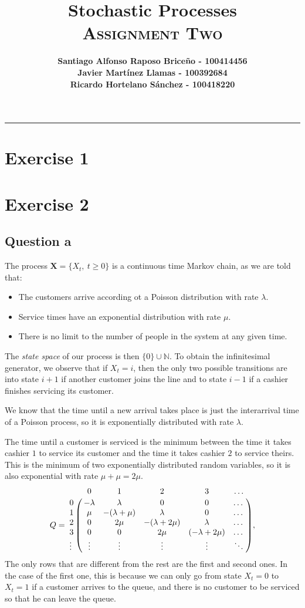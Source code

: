 \documentclass[11pt, a4paper]{article}
\title{\vspace{-8ex} \huge \bfseries Stochastic Processes\\
	\LARGE \normalfont \textsc{Assignment Two} \vspace{-2ex}}
\author{\bfseries Santiago Alfonso Raposo Briceño - 100414456 \\
	\bfseries Javier Martínez Llamas - 100392684\\
	\bfseries Ricardo Hortelano Sánchez - 100418220}
\date{\vspace{-5ex}} %
\begin{document}
	\maketitle
	\hrule

\section{Exercise 1}

\section{Exercise 2}
\subsection*{Question a}
The process $\bm{X} = \{X_t, \ t\geq 0\}$ is a continuous time Markov chain, as we are told that:
\begin{itemize}
	\item The customers arrive according ot a Poisson distribution with rate $\lambda$.
	\item Service times have an exponential distribution with rate $\mu$.
	\item There is no limit to the number of people in the system at any given time.
\end{itemize}

The \emph{state space} of our process is then $\{0\} \cup \mathbb{N}$. 
To obtain the infinitesimal generator, we observe that if $X_t = i$, then the only two possible transitions are into state $i+1$ if another customer joins the line and to state $i-1$ if a cashier finishes servicing its customer.

We know that the time until a new arrival takes place is just the interarrival time of a Poisson process, so it is exponentially distributed with rate $\lambda$.

The time until a customer is serviced is the minimum between the time it takes cashier $1$ to service its customer and the time it takes cashier $2$ to service theirs. 
This is the minimum of two exponentially distributed random variables, so it is also exponential with rate $\mu + \mu = 2\mu$.
\[
Q = \bordermatrix{%
	 & 0 & 1 & 2 & 3 & \dots \cr
	0& -\lambda & \lambda  & 0        & 0        & \dots  \cr
	1 & \mu       & -(\lambda+\mu) & \lambda  & 0        & \dots  \cr
	2& 0        & 2\mu        & -(\lambda+2\mu) & \lambda  & \dots  \cr
	3 &0        & 0        & 2\mu        & (-\lambda + 2\mu) & \dots  \cr
	\vdots & \vdots   & \vdots   & \vdots   & \vdots   & \ddots
},
\]
The only rows that are different from the rest are the first and second ones.
In the case of the first one, this is because we can only go from state $X_t = 0$ to $X_t = 1$ if a customer arrives to the queue, and there is no customer to be serviced so that he can leave the queue.
\end{document}
